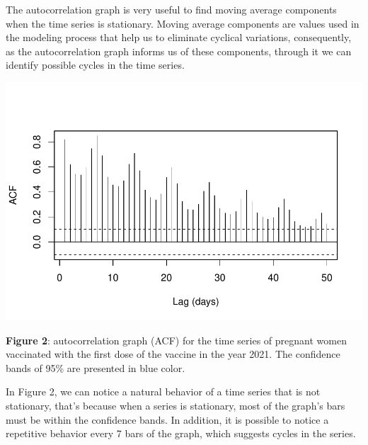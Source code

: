 \documentclass[
]{article}
\newenvironment{Shaded}{\begin{snugshade}}{\end{snugshade}}
\newcommand{\AttributeTok}[1]{\textcolor[rgb]{0.13,0.29,0.53}{#1}}
\newcommand{\DecValTok}[1]{\textcolor[rgb]{0.00,0.00,0.81}{#1}}
\newcommand{\FunctionTok}[1]{\textcolor[rgb]{0.13,0.29,0.53}{\textbf{#1}}}
\newcommand{\NormalTok}[1]{#1}
\newcommand{\SpecialCharTok}[1]{\textcolor[rgb]{0.81,0.36,0.00}{\textbf{#1}}}
\newcommand{\StringTok}[1]{\textcolor[rgb]{0.31,0.60,0.02}{#1}}
\renewenvironment{Shaded}{\begin{mdframed}[ backgroundcolor=shadecolor, linecolor = shadecolor, leftmargin=\dimexpr\leftmargin-2pt\relax, innerleftmargin=1.6pt, innertopmargin=5pt, skipabove=10pt,skipbelow=3pt ]}{\end{mdframed}}
\begin{document}
The autocorrelation graph is very useful to find moving average
components when the time series is stationary. Moving average components
are values used in the modeling process that help us to eliminate
cyclical variations, consequently, as the autocorrelation graph informs
us of these components, through it we can identify possible cycles in
the time series.

\begin{Shaded}
\end{Shaded}

\begin{center}\includegraphics[width=\linewidth]{IF_results_ENG_files/figure-latex/unnamed-chunk-2-1} \end{center}

\textbf{Figure 2}: autocorrelation graph (ACF) for the time series of
pregnant women vaccinated with the first dose of the vaccine in the year
2021. The confidence bands of 95\% are presented in blue color.

In Figure 2, we can notice a natural behavior of a time series that is
not stationary, that's because when a series is stationary, most of the
graph's bars must be within the confidence bands. In addition, it is
possible to notice a repetitive behavior every 7 bars of the graph,
which suggests cycles in the series.
\end{document}
